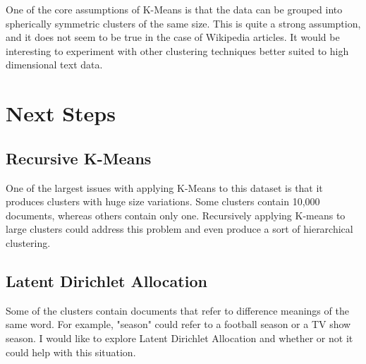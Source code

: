 \documentclass{article} %
\begin{document}
One of the core assumptions of K-Means is that the data can be grouped into spherically symmetric clusters of the same size. This is quite a strong assumption, and it does not seem to be true in the case of Wikipedia articles. It would be interesting to experiment with other clustering techniques better suited to high dimensional text data. 


\section{Next Steps}

\subsection{Recursive K-Means}

One of the largest issues with applying K-Means to this dataset is that it produces clusters with huge size variations. Some clusters contain 10,000 documents, whereas others contain only one. Recursively applying K-means to large clusters could address this problem and even produce a sort of hierarchical clustering.

\subsection{Latent Dirichlet Allocation}

Some of the clusters contain documents that refer to difference meanings of the same word. For example, "season" could refer to a football season or a TV show season. I would like to explore Latent Dirichlet Allocation and whether or not it could help with this situation.
\end{document}
